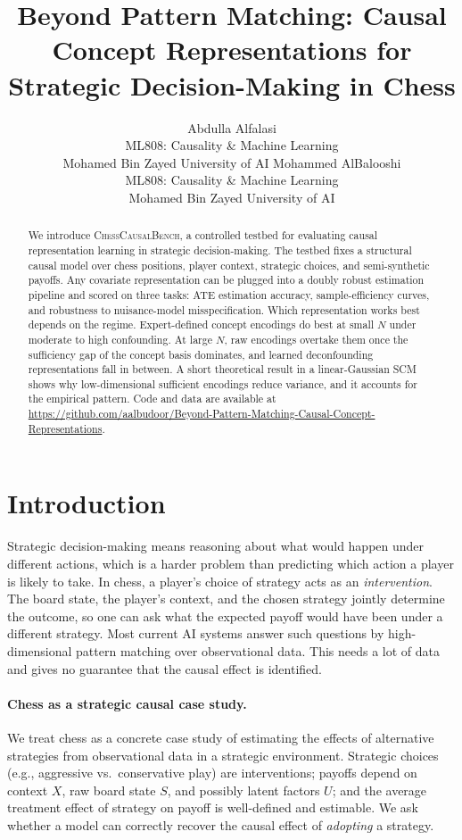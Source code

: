 \documentclass{article}
\title{Beyond Pattern Matching: Causal Concept Representations for Strategic Decision-Making in Chess}
\author{%
  Abdulla Alfalasi \\
  ML808: Causality \& Machine Learning \\
  Mohamed Bin Zayed University of AI
  \And
  Mohammed AlBalooshi \\
  ML808: Causality \& Machine Learning \\
  Mohamed Bin Zayed University of AI
}
\begin{document}
\maketitle

\begin{abstract}
We introduce \textsc{ChessCausalBench}, a controlled testbed for evaluating causal
representation learning in strategic decision-making. The testbed fixes a
structural causal model over chess positions, player context, strategic choices,
and semi-synthetic payoffs. Any covariate representation can be plugged into a
doubly robust estimation pipeline and scored on three tasks: ATE estimation
accuracy, sample-efficiency curves, and robustness to nuisance-model
misspecification. Which representation works best depends on the regime.
Expert-defined concept encodings do best at small $N$ under moderate to high
confounding. At large $N$, raw encodings overtake them once the sufficiency gap
of the concept basis dominates, and learned deconfounding representations fall
in between. A short theoretical result in a linear-Gaussian SCM shows why
low-dimensional sufficient encodings reduce variance, and it accounts for the
empirical pattern. Code and data are available at
\url{https://github.com/aalbudoor/Beyond-Pattern-Matching-Causal-Concept-Representations}.
\end{abstract}

\section{Introduction}

Strategic decision-making means reasoning about what would happen under
different actions, which is a harder problem than predicting which action a
player is likely to take. In chess, a player's choice of strategy acts as an
\emph{intervention}. The board state, the player's context, and the chosen
strategy jointly determine the outcome, so one can ask what the expected payoff
would have been under a different strategy. Most current AI systems answer such
questions by high-dimensional pattern matching over observational
data.\cite{lake2017building,reasoningAIMag} This needs a lot of data and gives
no guarantee that the causal effect is identified.

\paragraph{Chess as a strategic causal case study.}
We treat chess as a concrete case study of estimating the effects of alternative
strategies from observational data in a strategic environment. Strategic choices
(e.g., aggressive vs.\ conservative play) are interventions; payoffs depend on
context $X$, raw board state $S$, and possibly latent factors $U$; and the
average treatment effect of strategy on payoff is well-defined and
estimable.\cite{pearl2009causality,hill2011bayesian,chernozhukov2018double} We
ask whether a model can correctly recover the causal effect of \emph{adopting} a
strategy.
\end{document}
